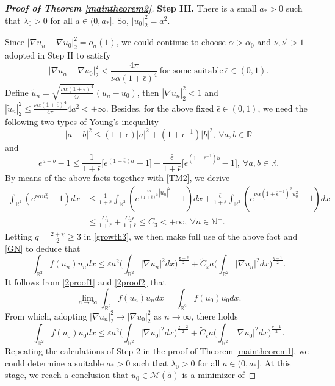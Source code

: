 \documentclass[11pt]{amsart}
\numberwithin{equation}{section}
\theoremstyle{definition}
\newcommand{\R}{\mathbb{R}}
\begin{document}
\begin{proof}[\emph{\textbf{Proof of Theorem \ref{maintheorem2}}}]
\smallskip

 \textbf{Step III.} There is a small $a_*>0$ such that $\lambda_0>0$ for all $a\in(0,a_*]$.
So, $|u_0|_2^2=a^2$.

Since $|\nabla u_n-\nabla u_0|_2^2=o_n(1)$, we could continue to choose $\alpha>\alpha_0$
and $\nu,\nu^\prime>1$ adopted in Step II to satisfy
\[
 |\nabla u_n-\nabla u_0|_2^2  <\frac{4\pi}{\nu\alpha(1+\bar{\epsilon})^4}~\text{for some suitable}~\bar{\epsilon}\in(0,1).
\]
Define $\tilde{u}_n=\sqrt{\frac{\nu\alpha(1+\bar{\epsilon})^4}{4\pi}}(u_n-u_0)$, then $|\nabla \tilde{u}_n|_2^2<1$ and $|\tilde{u}_n|_2^2
\leq\frac{\nu\alpha(1+\bar{\epsilon})^4}{4\pi}4a^2<+\infty$.
Besides, for the above fixed $\bar{\epsilon}\in(0,1)$, we need the following two types of Young's inequality
\[
 |a+b|^2\leq(1+\bar{\epsilon})|a|^2+(1+\bar{\epsilon}^{-1})|b|^2,~\forall a,b\in\R
\]
and
\[
e^{a+b}-1\leq \frac{1}{1+\bar{\epsilon}}\big[e^{(1+\bar{\epsilon})a}-1\big]
+\frac{\bar{\epsilon}}{1+\bar{\epsilon}}\big[e^{(1+\bar{\epsilon}^{-1})b}-1\big],~\forall a,b\in\R.
\]
By means of the above facts together with \eqref{TM2}, we derive
 \begin{align*}
\int_{\R^2} (e^{ \nu\alpha u_n^2}-1) dx&\leq\frac{1}{1+\bar{\epsilon}}
\int_{\R^2} (e^{\frac{4\pi}{(1+\bar{\epsilon})^2} |\tilde{u}_n|^2}-1) dx
+\frac{\bar{\epsilon}}{1+\bar{\epsilon}}\int_{\R^2} (e^{\nu\alpha(1+\bar{\epsilon}^{-1})^2 u_0^2}-1) dx \\
  & \leq \frac{C_1}{1+\bar{\epsilon}}+\frac{C_2\bar{\epsilon}}{1+\bar{\epsilon}}\leq C_3 <+\infty,~\forall n\in \mathbb{N}^+.
\end{align*}
Letting $q=\frac{2+\chi}{2}\geq3$ in \eqref{growth3}, we then make full use of the above fact and \eqref{GN} to deduce that
\[
\int_{\R^2} f (u_n)u_ndx \leq \varepsilon a^2\bigg(\int_{\R^2} |\nabla u_n|^2 dx\bigg)^{\frac{\chi-2}{2}}
   +\tilde{C}_\varepsilon a \bigg(\int_{\R^2} |\nabla u_n|^{2}dx\bigg)^{\frac{q-1}2}.
\]
It follows from \eqref{2proof1} and \eqref{2proof2} that
\[
\lim_{n\to\infty}\int_{\R^{2}} f(u_n)u_n dx=\int_{\R^{2}} f(u_0 )u_0  dx.
\]
From which, adopting $|\nabla u_n|_2^2\to|\nabla u_0|_2^2$ as $n\to\infty$, there holds
\[
\int_{\R^2} f (u_0 )u_0 dx \leq \varepsilon a^2\bigg(\int_{\R^2} |\nabla u_0|^2 dx\bigg)^{\frac{\chi-2}{2}}
   +\tilde{C}_\varepsilon a \bigg(\int_{\R^2} |\nabla u_0|^{2}dx\bigg)^{\frac{q-1}2}.
\]
Repeating the calculations of Step 2 in the proof of Theorem \ref{maintheorem1},
we could determine a suitable $a_*>0$ such that $\lambda_0>0$ for all $a\in(0,a_*]$.
At this stage, we reach a conclusion that $u_0\in \mathcal{M}(\tilde{a})$ is a minimizer of

\end{proof}
\end{document}

